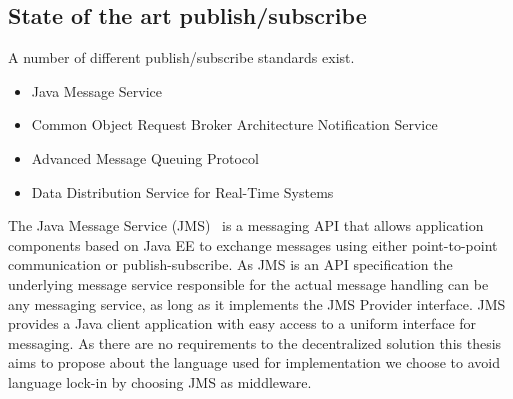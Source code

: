



\subsection{State of the art publish/subscribe}
A number of different publish/subscribe standards exist.

\begin{itemize}
	\item Java Message Service
	\item Common Object Request Broker Architecture Notification Service
	\item Advanced Message Queuing Protocol
	\item Data Distribution Service for Real-Time Systems
\end{itemize}

The Java Message Service (JMS)~\cite{hapner2002java} is a messaging API that allows application components based on Java EE to exchange messages using either point-to-point communication or publish-subscribe. As JMS is an API specification the underlying message service responsible for the actual message handling can be any messaging service, as long as it implements the JMS Provider interface. JMS provides a Java client application with easy access to a uniform interface for messaging. As there are no requirements to the decentralized solution this thesis aims to propose about the language used for implementation we choose to avoid language lock-in by choosing JMS as middleware. 

